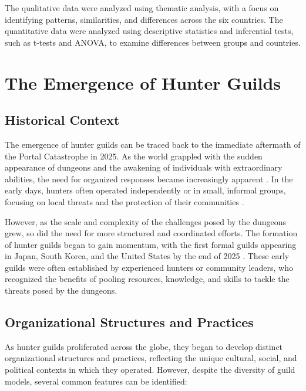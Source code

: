 \documentclass[12pt]{article}
\begin{document}
The qualitative data were analyzed using thematic analysis, with a focus on identifying patterns, similarities, and differences across the six countries. The quantitative data were analyzed using descriptive statistics and inferential tests, such as t-tests and ANOVA, to examine differences between groups and countries.

\section{The Emergence of Hunter Guilds}
\subsection{Historical Context}
The emergence of hunter guilds can be traced back to the immediate aftermath of the Portal Catastrophe in 2025. As the world grappled with the sudden appearance of dungeons and the awakening of individuals with extraordinary abilities, the need for organized responses became increasingly apparent \cite{Ishikawa2026}. In the early days, hunters often operated independently or in small, informal groups, focusing on local threats and the protection of their communities \cite{Nguyen2026}.

However, as the scale and complexity of the challenges posed by the dungeons grew, so did the need for more structured and coordinated efforts. The formation of hunter guilds began to gain momentum, with the first formal guilds appearing in Japan, South Korea, and the United States by the end of 2025 \cite{Nakamura2026, Seo2027, Branson2027}. These early guilds were often established by experienced hunters or community leaders, who recognized the benefits of pooling resources, knowledge, and skills to tackle the threats posed by the dungeons.

\subsection{Organizational Structures and Practices}
As hunter guilds proliferated across the globe, they began to develop distinct organizational structures and practices, reflecting the unique cultural, social, and political contexts in which they operated. However, despite the diversity of guild models, several common features can be identified:
\end{document}
